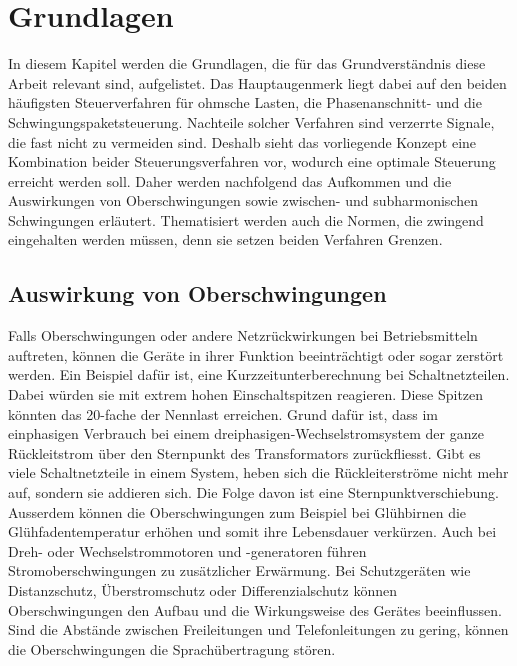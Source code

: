 

\section{Grundlagen}
In diesem Kapitel werden die Grundlagen, die für das Grundverständnis diese Arbeit relevant sind, aufgelistet. Das Hauptaugenmerk liegt dabei auf den beiden häufigsten Steuerverfahren für ohmsche Lasten, die Phasenanschnitt- und die Schwingungspaketsteuerung. Nachteile solcher Verfahren sind verzerrte Signale, die fast nicht zu vermeiden sind. Deshalb sieht das vorliegende Konzept eine Kombination beider Steuerungsverfahren vor, wodurch eine optimale Steuerung erreicht werden soll. Daher werden nachfolgend das Aufkommen und die Auswirkungen von Oberschwingungen sowie zwischen- und subharmonischen Schwingungen erläutert. Thematisiert werden auch die Normen, die zwingend eingehalten werden müssen, denn sie setzen beiden Verfahren Grenzen.

\subsection{Auswirkung von Oberschwingungen}

Falls Oberschwingungen oder andere Netzrückwirkungen bei Betriebsmitteln auftreten, können die Geräte in ihrer Funktion beeinträchtigt oder sogar zerstört werden. Ein Beispiel dafür ist, eine Kurzzeitunterberechnung bei Schaltnetzteilen. Dabei würden sie mit extrem hohen Einschaltspitzen reagieren. Diese Spitzen könnten das 20-fache der Nennlast erreichen. Grund dafür ist, dass im einphasigen Verbrauch bei einem dreiphasigen-Wechselstromsystem der ganze Rückleitstrom über den Sternpunkt des Transformators zurückfliesst. Gibt es viele Schaltnetzteile in einem System, heben sich die Rückleiterströme nicht mehr auf, sondern sie addieren sich. Die Folge davon ist eine Sternpunktverschiebung. Ausserdem können die Oberschwingungen zum Beispiel bei Glühbirnen die Glühfadentemperatur erhöhen und somit ihre Lebensdauer verkürzen. Auch bei Dreh- oder Wechselstrommotoren und -generatoren führen Stromoberschwingungen zu zusätzlicher Erwärmung. Bei Schutzgeräten wie Distanzschutz, Überstromschutz oder Differenzialschutz können Oberschwingungen den Aufbau und die Wirkungsweise des Gerätes beeinflussen. Sind die Abstände zwischen Freileitungen und Telefonleitungen zu gering, können die Oberschwingungen die Sprachübertragung stören.



